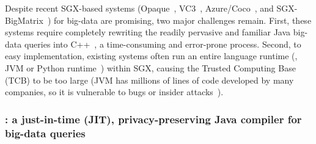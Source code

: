 Despite recent SGX-based systems (Opaque~\cite{opaque:nsdi17}, 
VC3~\cite{vc3:sp15}, Azure/Coco~\cite{azure:coco}, and 
SGX-BigMatrix~\cite{bigmatrix:ccs17}) for big-data are promising, two major 
challenges remain. First, these systems require completely rewriting the 
readily pervasive and familiar Java big-data queries 
into C++~\cite{opaque:nsdi17,vc3:sp15,azure:coco}, a time-consuming and 
error-prone process. Second, to easy implementation, existing systems often 
run an entire language runtime (\eg, JVM or Python 
runtime~\cite{bigmatrix:ccs17}) within SGX, causing the Trusted Computing Base 
(TCB) to be too large (JVM has millions of lines of code developed
by many companies, so it is vulnerable to bugs or insider 
attacks~\cite{top-threats}).

\vspace{-.15in}
\subsubsection{\maat: a just-in-time (JIT), privacy-preserving Java compiler 
for big-data queries} 
\label{sec:jit-arch}\vspace{-.075in}

